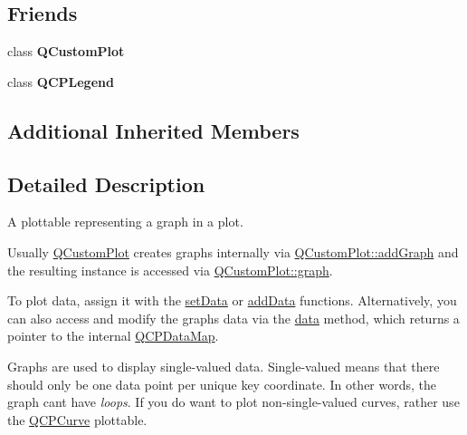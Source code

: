 \subsection*{Friends}
\begin{DoxyCompactItemize}
\item 
\mbox{\label{class_q_c_p_graph_a1cdf9df76adcfae45261690aa0ca2198}} 
class {\bfseries Q\+Custom\+Plot}
\item 
\mbox{\label{class_q_c_p_graph_a8429035e7adfbd7f05805a6530ad5e3b}} 
class {\bfseries Q\+C\+P\+Legend}
\end{DoxyCompactItemize}
\subsection*{Additional Inherited Members}


\subsection{Detailed Description}
A plottable representing a graph in a plot. 



Usually \mbox{\hyperlink{class_q_custom_plot}{Q\+Custom\+Plot}} creates graphs internally via \mbox{\hyperlink{class_q_custom_plot_a6fb2873d35a8a8089842d81a70a54167}{Q\+Custom\+Plot\+::add\+Graph}} and the resulting instance is accessed via \mbox{\hyperlink{class_q_custom_plot_a6ecae130f684b25276fb47bd3a5875c6}{Q\+Custom\+Plot\+::graph}}.

To plot data, assign it with the \mbox{\hyperlink{class_q_c_p_graph_a1df2fd710545c8ba3b2c99a39a27bf8b}{set\+Data}} or \mbox{\hyperlink{class_q_c_p_graph_aa5c6181d84db72ce4dbe9dc15a34ef4f}{add\+Data}} functions. Alternatively, you can also access and modify the graph\textquotesingle{}s data via the \mbox{\hyperlink{class_q_c_p_graph_acde1c0d1f6a817930489548396e6b3e6}{data}} method, which returns a pointer to the internal \mbox{\hyperlink{qcustomplot_8h_a84a9c4a4c2216ccfdcb5f3067cda76e3}{Q\+C\+P\+Data\+Map}}.

Graphs are used to display single-\/valued data. Single-\/valued means that there should only be one data point per unique key coordinate. In other words, the graph can\textquotesingle{}t have {\itshape loops}. If you do want to plot non-\/single-\/valued curves, rather use the \mbox{\hyperlink{class_q_c_p_curve}{Q\+C\+P\+Curve}} plottable.

